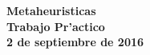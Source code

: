 \documentclass[11pt,a4paper]{article}
\begin{document}
\parskip=5pt

\thispagestyle{empty}

\def\Materia{Metaheuristicas}
\def\Titulo{Trabajo Pr'actico}
\def\Fecha{2 de septiembre de 2016}

\begin{center}
    {\LARGE\textbf{\Materia}}\\[1em]    
    \vspace{5mm}
    {\Large \textbf{\Titulo}}\\[1em]
    \vspace{2mm}
    {\textbf{\large \Fecha}}\\
    \vspace{5mm}
    \textbf{\tablaints}
\end{center}

\tableofcontents

\newpage

\pagestyle{headings}
\setcounter{page}{1}

%





\end{document}

